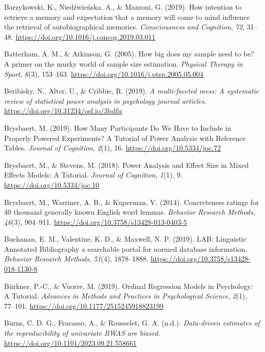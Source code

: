 \documentclass[
  man]{apa7}
\newlength{\cslhangindent}
\newenvironment{CSLReferences}[2] %
 {\begin{list}{}{%
  \setlength{\itemindent}{0pt}
  \setlength{\leftmargin}{0pt}
  \setlength{\parsep}{0pt}
  \ifodd #1
   \setlength{\leftmargin}{\cslhangindent}
   \setlength{\itemindent}{-1\cslhangindent}
  \fi
  \setlength{\itemsep}{#2\baselineskip}}}
 {\end{list}}
\begin{document}
\begin{CSLReferences}{1}{0}
Barzykowski, K., Niedźwieńska, A., \& Mazzoni, G. (2019). How intention to retrieve a memory and expectation that a memory will come to mind influence the retrieval of autobiographical memories. \emph{Consciousness and Cognition}, \emph{72}, 31--48. \url{https://doi.org/10.1016/j.concog.2019.03.011}

Batterham, A. M., \& Atkinson, G. (2005). How big does my sample need to be? A primer on the murky world of sample size estimation. \emph{Physical Therapy in Sport}, \emph{6}(3), 153--163. \url{https://doi.org/10.1016/j.ptsp.2005.05.004}

Beribisky, N., Alter, U., \& Cribbie, R. (2019). \emph{A multi-faceted mess: A systematic review of statistical power analysis in psychology journal articles}. \url{https://doi.org/10.31234/osf.io/3bdfu}

Brysbaert, M. (2019). How Many Participants Do We Have to Include in Properly Powered Experiments? A Tutorial of Power Analysis with Reference Tables. \emph{Journal of Cognition}, \emph{2}(1), 16. \url{https://doi.org/10.5334/joc.72}

Brysbaert, M., \& Stevens, M. (2018). Power Analysis and Effect Size in Mixed Effects Models: A Tutorial. \emph{Journal of Cognition}, \emph{1}(1), 9. \url{https://doi.org/10.5334/joc.10}

Brysbaert, M., Warriner, A. B., \& Kuperman, V. (2014). Concreteness ratings for 40 thousand generally known English word lemmas. \emph{Behavior Research Methods}, \emph{46}(3), 904--911. \url{https://doi.org/10.3758/s13428-013-0403-5}

Buchanan, E. M., Valentine, K. D., \& Maxwell, N. P. (2019). LAB: Linguistic Annotated Bibliography {\textendash} a searchable portal for normed database information. \emph{Behavior Research Methods}, \emph{51}(4), 1878--1888. \url{https://doi.org/10.3758/s13428-018-1130-8}

Bürkner, P.-C., \& Vuorre, M. (2019). Ordinal Regression Models in Psychology: A Tutorial. \emph{Advances in Methods and Practices in Psychological Science}, \emph{2}(1), 77--101. \url{https://doi.org/10.1177/2515245918823199}

Burns, C. D. G., Fracasso, A., \& Rousselet, G. A. (n.d.). \emph{Data-driven estimates of the reproducibility of univariate BWAS are biased}. \url{https://doi.org/10.1101/2023.09.21.558661}


\end{CSLReferences}
\end{document}
